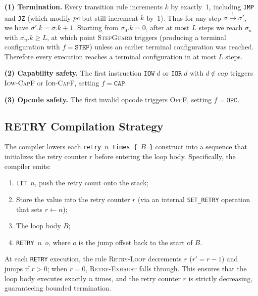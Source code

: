 \documentclass[a4paper,fleqn,longmktitle]{cas-dc}
\begin{document}
\begin{pf}
\textbf{(1) Termination.} Every transition rule increments $k$ by exactly~1, including \texttt{JMP} and \texttt{JZ} (which modify $pc$ but still increment $k$ by~1). Thus for any step $\sigma \xrightarrow{1} \sigma'$, we have $\sigma'.k = \sigma.k + 1$. Starting from $\sigma_0.k = 0$, after at most $L$ steps we reach $\sigma_n$ with $\sigma_n.k \geq L$, at which point \textsc{StepGuard} triggers (producing a terminal configuration with $f = \texttt{STEP}$) unless an earlier terminal configuration was reached. Therefore every execution reaches a terminal configuration in at most $L$ steps.

\textbf{(2) Capability safety.} The first instruction $\texttt{IOW}\;d$ or $\texttt{IOR}\;d$ with $d \notin \mathit{cap}$ triggers \textsc{Iow-CapF} or \textsc{Ior-CapF}, setting $f = \texttt{CAP}$.

\textbf{(3) Opcode safety.} The first invalid opcode triggers \textsc{OpcF}, setting $f = \texttt{OPC}$.
\end{pf}

\subsection{RETRY Compilation Strategy}
\label{app:compiler_strategy}

The compiler lowers each \texttt{retry $n$ times \{ $B$ \}} construct into a sequence that initializes the retry counter $r$ before entering the loop body. Specifically, the compiler emits:

\begin{enumerate}[nosep]
  \item \texttt{LIT $n$}, push the retry count onto the stack;
  \item Store the value into the retry counter $r$ (via an internal \texttt{SET\_RETRY} operation that sets $r \leftarrow n$);
  \item The loop body $B$;
  \item \texttt{RETRY $n$ $o$}, where $o$ is the jump offset back to the start of $B$.
\end{enumerate}

At each \texttt{RETRY} execution, the rule \textsc{Retry-Loop} decrements $r$ ($r' = r - 1$) and jumps if $r > 0$; when $r = 0$, \textsc{Retry-Exhaust} falls through. This ensures that the loop body executes exactly $n$ times, and the retry counter $r$ is strictly decreasing, guaranteeing bounded termination.
\end{document}
